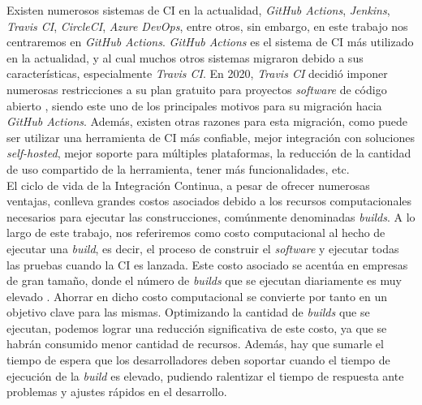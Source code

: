 Existen numerosos sistemas de CI en la actualidad, \textit{GitHub Actions},
\textit{Jenkins}, \textit{Travis CI}, \textit{CircleCI}, \textit{Azure DevOps}, entre otros, sin
embargo, en este trabajo nos centraremos en \textit{GitHub Actions}. \textit{GitHub Actions} es
el sistema de CI más utilizado en la actualidad, y al cual muchos otros sistemas
migraron debido a sus características, especialmente \textit{Travis CI}. En 2020, \textit{Travis
CI} decidió imponer numerosas restricciones a su plan gratuito para proyectos \textit{software}
de código abierto \cite{9}, siendo este uno de los principales motivos para su migración hacia
\textit{GitHub Actions}. Además, existen otras razones para esta migración, como puede ser
utilizar una herramienta de CI más confiable, mejor integración con soluciones 
\textit{self-hosted}, mejor soporte para múltiples plataformas, la reducción de la cantidad de
uso compartido de la herramienta, tener más funcionalidades, etc.\\

El ciclo de vida de la Integración Continua, a pesar de ofrecer numerosas ventajas, conlleva
grandes costos asociados debido a los recursos computacionales \cite{10} necesarios para ejecutar
las construcciones, comúnmente denominadas \textit{builds}. A lo largo de este trabajo,
nos referiremos como costo computacional al hecho de ejecutar una \textit{build}, es decir, el
proceso de construir el \textit{software} y ejecutar todas las pruebas cuando la CI es
lanzada. Este costo asociado se acentúa en empresas de gran tamaño, donde el número de
\textit{builds} que se ejecutan diariamente es muy elevado \cite{12,13}. Ahorrar en dicho costo
computacional se convierte por tanto en un objetivo clave para las mismas. Optimizando la cantidad
de \textit{builds} que se ejecutan, podemos lograr una reducción significativa de este costo, ya
que se habrán consumido menor cantidad de recursos. Además, hay que sumarle el tiempo de espera
que los desarrolladores deben soportar cuando el tiempo de ejecución de la \textit{build} es
elevado, pudiendo ralentizar el tiempo de respuesta ante problemas y ajustes rápidos en el
desarrollo.\\

